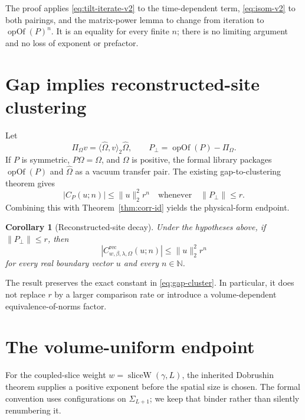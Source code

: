 \documentclass[11pt]{article}
\newtheorem{corollary}[theorem]{Corollary}
\newcommand{\N}{\mathbb N}
\begin{document}
The proof applies \eqref{eq:tilt-iterate-v2} to the time-dependent term,
\eqref{eq:isom-v2} to both pairings, and the matrix-power lemma to change from
iteration to $\operatorname{opOf}(P)^n$.  It is an equality for every finite
$n$; there is no limiting argument and no loss of exponent or prefactor.

\section{Gap implies reconstructed-site clustering}

Let
\[
 \Pi_\Omega v=\langle\widehat\Omega,v\rangle_2\widehat\Omega,
 \qquad P_\perp=\operatorname{opOf}(P)-\Pi_\Omega.
\]
If $P$ is symmetric, $P\Omega=\Omega$, and $\Omega$ is positive, the formal
library packages $\operatorname{opOf}(P)$ and $\widehat\Omega$ as a vacuum
transfer pair.  The existing gap-to-clustering theorem gives
\begin{equation}\label{eq:gap-cluster}
 |C_P(u;n)|\leq \|u\|_2^2 r^n
 \quad\text{whenever}\quad \|P_\perp\|\leq r.
\end{equation}
Combining this with Theorem~\ref{thm:corr-id} yields the physical-form
endpoint.

\begin{corollary}[Reconstructed-site decay]\label{cor:rec-decay}
Under the hypotheses above, if $\|P_\perp\|\leq r$, then
\begin{equation}\label{eq:rec-decay}
 |C^{\mathrm{rec}}_{w,\beta,\lambda,\Omega}(u;n)|
 \leq \|u\|_2^2 r^n
\end{equation}
for every real boundary vector $u$ and every $n\in\N$.
\end{corollary}

The result preserves the exact constant in \eqref{eq:gap-cluster}.  In
particular, it does not replace $r$ by a larger comparison rate or introduce a
volume-dependent equivalence-of-norms factor.

\section{The volume-uniform endpoint}

For the coupled-slice weight $w=\operatorname{sliceW}(\gamma,L)$, the inherited
Dobrushin theorem supplies a positive exponent before the spatial size is
chosen.  The formal convention uses configurations on $\Sigma_{L+1}$; we keep
that binder rather than silently renumbering it.
\end{document}
